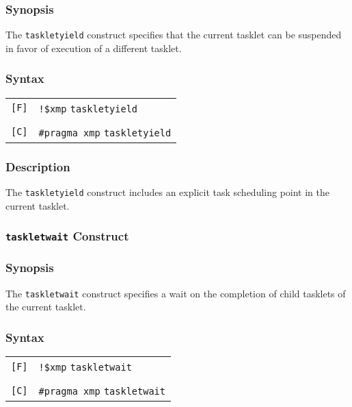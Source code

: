 \subsubsection*{Synopsis}

The \verb|taskletyield| construct specifies that the current tasklet can
be suspended in favor of execution of a different tasklet.

\subsubsection*{Syntax}

\begin{tabular}{ll}
\verb![F]! & \verb|!$xmp| {\tt taskletyield} \\
& \\
\verb![C]! & \verb|#pragma xmp| {\tt taskletyield} \\
\end{tabular}

\subsubsection*{Description}

The \verb|taskletyield| construct includes an explicit task scheduling
point in the current tasklet.

%
%

\subsubsection{{\tt taskletwait} Construct}

\subsubsection*{Synopsis}

The \verb|taskletwait| construct specifies a wait on the completion of
child tasklets of the current tasklet.

\subsubsection*{Syntax}

\begin{tabular}{ll}
\verb![F]! & \verb|!$xmp| {\tt taskletwait} \\
& \\
\verb![C]! & \verb|#pragma xmp| {\tt taskletwait} \\
\end{tabular}

